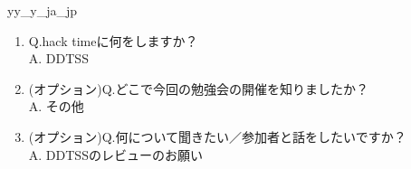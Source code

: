 \begin{prework}{ yy\_y\_ja\_jp }
  \begin{enumerate}
  \item Q.hack timeに何をしますか？\\
    A. DDTSS 
  \item (オプション)Q.どこで今回の勉強会の開催を知りましたか？\\
    A. その他
  \item (オプション)Q.何について聞きたい／参加者と話をしたいですか？\\
    A. DDTSSのレビューのお願い
  \end{enumerate}
\end{prework}


